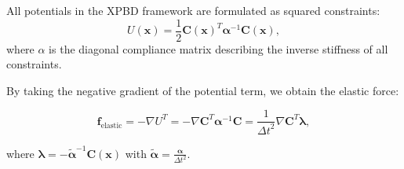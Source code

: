 \begin{frame}


All potentials in the XPBD framework are formulated as squared constraints:
\begin{equation}
    U\left(\mathbf{x}\right)=\frac{1}{2} \mathbf{C}\left(\mathbf{x}\right)^{T} \boldsymbol{\alpha}^{-1} \mathbf{C}\left(\mathbf{x}\right), \nonumber
\end{equation}
where $\alpha$ is the diagonal compliance matrix describing the inverse stiffness of all constraints. 

\SepLine

By taking the negative gradient of the potential term, we obtain the elastic force:

\begin{equation}
    \mathbf{f}_{\text {elastic}}=-\nabla U^T=-\nabla \mathbf{C}^T \boldsymbol{\alpha}^{-1} \mathbf{C} = \frac{1}{{\Delta t}^2} \nabla \mathbf{C}^T \boldsymbol{\lambda},  \nonumber
\end{equation}

where 
$\boldsymbol{\lambda}=-\boldsymbol{\tilde{\alpha}}^{-1} \mathbf{C}\left(\mathbf{x}\right)$
with $\boldsymbol{\tilde{\alpha}}=\frac{\boldsymbol{\alpha}}{\Delta t^2}$.

\end{frame}

